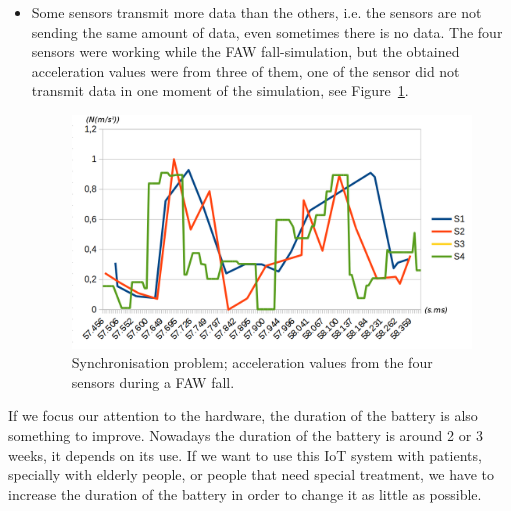 \documentclass[review]{elsarticle}
\begin{document}
\begin{itemize}
 The acceleration values show that in less than 250 milliseconds there are more than 30 values from ``fall 1'', and
 in more than 350 milliseconds there are 12 values from ``fall 2''. There is a lack of synchronisation not only in
 the amount of data, but also in the time.
 
 \item Some sensors transmit more data than the others, i.e. the sensors are not 
 sending the same amount of data, even sometimes there is no data. The four sensors were working while the FAW fall-simulation, but the obtained acceleration values were from three of them, one of the sensor did not transmit data 
 in one moment of the simulation, see Figure~\ref{fig:synchronisation2}.
 
 \begin{figure}[!ht]
  \centering
  \includegraphics[scale=0.22]{img/synchronisation2.png}
  \caption[Comparison acceleration during two FAW falls]{Synchronisation problem; acceleration values from the four sensors during a FAW fall.}
  \label{fig:synchronisation2}
 \end{figure}
\end{itemize}

If we focus our attention to the hardware, the duration of the battery is also something to improve. Nowadays the 
duration of the battery is around 2 or 3 weeks, it depends on its use. If we want to use this IoT system with patients, 
specially with elderly people, or people that need special treatment, we have to increase the duration of the battery 
in order to change it as little as possible.
\end{document}
